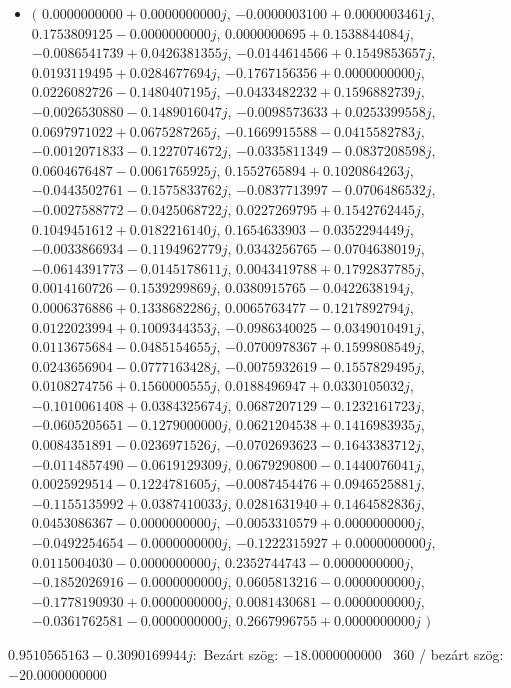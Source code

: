 \documentclass[14pt,a4paper]{article}
\begin{document}
\begin{itemize}
\item
$\big($
$0.0000000000+0.0000000000j$, $-0.0000003100+0.0000003461j$, $0.1753809125-0.0000000000j$, $0.0000000695+0.1538844084j$, $-0.0086541739+0.0426381355j$, $-0.0144614566+0.1549853657j$, $0.0193119495+0.0284677694j$, $-0.1767156356+0.0000000000j$, $0.0226082726-0.1480407195j$, $-0.0433482232+0.1596882739j$, $-0.0026530880-0.1489016047j$, $-0.0098573633+0.0253399558j$, $0.0697971022+0.0675287265j$, $-0.1669915588-0.0415582783j$, $-0.0012071833-0.1227074672j$, $-0.0335811349-0.0837208598j$, $0.0604676487-0.0061765925j$, $0.1552765894+0.1020864263j$, $-0.0443502761-0.1575833762j$, $-0.0837713997-0.0706486532j$, $-0.0027588772-0.0425068722j$, $0.0227269795+0.1542762445j$, $0.1049451612+0.0182216140j$, $0.1654633903-0.0352294449j$, $-0.0033866934-0.1194962779j$, $0.0343256765-0.0704638019j$, $-0.0614391773-0.0145178611j$, $0.0043419788+0.1792837785j$, $0.0014160726-0.1539299869j$, $0.0380915765-0.0422638194j$, $0.0006376886+0.1338682286j$, $0.0065763477-0.1217892794j$, $0.0122023994+0.1009344353j$, $-0.0986340025-0.0349010491j$, $0.0113675684-0.0485154655j$, $-0.0700978367+0.1599808549j$, $0.0243656904-0.0777163428j$, $-0.0075932619-0.1557829495j$, $0.0108274756+0.1560000555j$, $0.0188496947+0.0330105032j$, $-0.1010061408+0.0384325674j$, $0.0687207129-0.1232161723j$, $-0.0605205651-0.1279000000j$, $0.0621204538+0.1416983935j$, $0.0084351891-0.0236971526j$, $-0.0702693623-0.1643383712j$, $-0.0114857490-0.0619129309j$, $0.0679290800-0.1440076041j$, $0.0025929514-0.1224781605j$, $-0.0087454476+0.0946525881j$, $-0.1155135992+0.0387410033j$, $0.0281631940+0.1464582836j$, $0.0453086367-0.0000000000j$, $-0.0053310579+0.0000000000j$, $-0.0492254654-0.0000000000j$, $-0.1222315927+0.0000000000j$, $0.0115004030-0.0000000000j$, $0.2352744743-0.0000000000j$, $-0.1852026916-0.0000000000j$, $0.0605813216-0.0000000000j$, $-0.1778190930+0.0000000000j$, $0.0081430681-0.0000000000j$, $-0.0361762581-0.0000000000j$, $0.2667996755+0.0000000000j$
$\big)$
\end{itemize}
$0.9510565163-0.3090169944j$:\
Bezárt szög: $-18.0000000000$ \
360 / bezárt szög: $-20.0000000000$\
\end{document}
